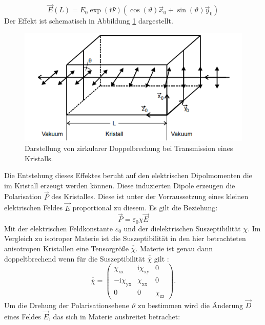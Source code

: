 \begin{equation*}
  \vec{E}(L)=E_\mathrm{0} \exp(\mathrm{i}\Psi)\left(\cos(\vartheta) \vec{x}_\mathrm{0} + \sin(\vartheta)\vec{y}_\mathrm{0}\right)
\end{equation*}
Der Effekt ist schematisch in Abbildung \ref{fig:brechung} dargestellt.
\begin{figure}[h]
  \centering
  \includegraphics[scale=0.7]{fig/brechung.png}
  \caption{Darstellung von zirkularer Doppelbrechung bei Transmission eines Kristalls. \cite[1]{Anleitung}}
  \label{fig:brechung}
\end{figure}
Die Entstehung dieses Effektes beruht auf den elektrischen Dipolmomenten die im Kristall erzeugt werden können. Diese induzierten Dipole erzeugen die Polarisation $\vec{P}$ des Kristalles. Diese ist unter der Vorraussetzung eines kleinen elektrischen Feldes $\vec{E}$ proportional zu diesem. Es gilt die Beziehung:
\begin{equation}
  \vec{P}=\varepsilon_\mathrm{0} \chi \vec{E}
\end{equation}
Mit der elektrischen Feldkonstante $\varepsilon_\mathrm{0}$ und der dielektrischen Suszeptibilität $\chi$. Im Vergleich zu isotroper Materie ist die Suszeptibilität in den hier betrachteten anisotropen Kristallen eine Tensorgröße $\overline{\overline{\chi}}$. Materie ist genau dann doppeltbrechend wenn für die Suszeptibilität $\overline{\overline{\chi}}$ gilt \cite[3-5]{Anleitung}:
\begin{equation}
  \label{eqn:chitensor}
  \overline{\overline{\chi}}=\begin{pmatrix} \chi_\mathrm{xx} & \mathrm{i}\chi_\mathrm{xy} & 0 \\ -\mathrm{i}\chi_\mathrm{yx} & \chi_\mathrm{xx} & 0 \\ 0 & 0 & \chi_\mathrm{zz} \end{pmatrix}.
\end{equation}
Um die Drehung der Polarisationsebene $\vartheta$ zu bestimmen wird die Änderung $\vec{D}$ eines Feldes $\vec{E}$, das sich in Materie ausbreitet betrachet:
